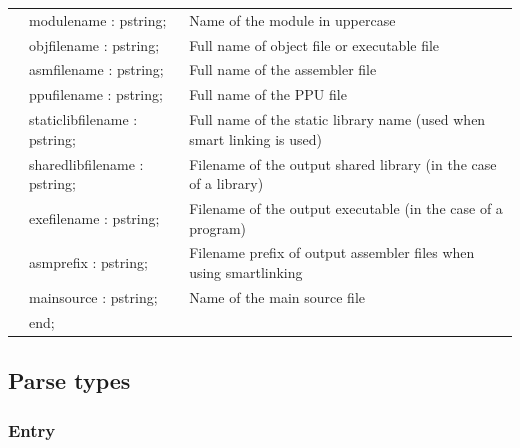 \documentclass [a4paper,12pt]{article}
\begin{document}
\begin{longtable}{|l@{\extracolsep{\fill}}lp{7cm}|}
&\textsf{modulename : pstring;}& Name of the module in uppercase \\
&\textsf{objfilename : pstring;}& Full name of object file or executable file \\
&\textsf{asmfilename : pstring;}& Full name of the assembler file \\
&\textsf{ppufilename : pstring;}& Full name of the PPU file \\
&\textsf{staticlibfilename : pstring;}& Full name of the static library name (used when smart linking is used) \\
&\textsf{sharedlibfilename : pstring;}& Filename of the output shared library (in the case of a library) \\
&\textsf{exefilename : pstring;}& Filename of the output executable (in the case of a program) \\
&\textsf{asmprefix : pstring;}& Filename prefix of output assembler files when using smartlinking \\
&\textsf{mainsource : pstring;}& Name of the main source file \\
&\textsf{end;}& \\
\end{longtable}

\subsection{Parse types}
\label{subsec:parse}

\subsubsection{Entry}
\label{subsubsec:entry}
\end{document}
